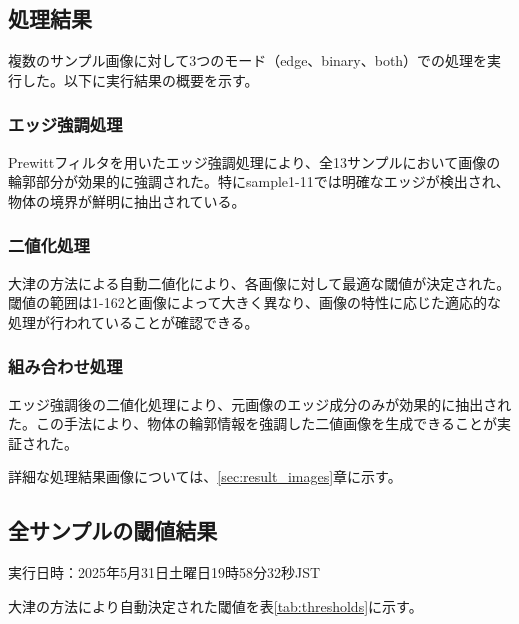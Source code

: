 \documentclass[a4paper,12pt]{jsarticle}
\begin{document}
\subsection{処理結果}

複数のサンプル画像に対して3つのモード（edge、binary、both）での処理を実行した。以下に実行結果の概要を示す。

\subsubsection{エッジ強調処理}
Prewittフィルタを用いたエッジ強調処理により、全13サンプルにおいて画像の輪郭部分が効果的に強調された。特にsample1-11では明確なエッジが検出され、物体の境界が鮮明に抽出されている。

\subsubsection{二値化処理}
大津の方法による自動二値化により、各画像に対して最適な閾値が決定された。閾値の範囲は1-162と画像によって大きく異なり、画像の特性に応じた適応的な処理が行われていることが確認できる。

\subsubsection{組み合わせ処理}
エッジ強調後の二値化処理により、元画像のエッジ成分のみが効果的に抽出された。この手法により、物体の輪郭情報を強調した二値画像を生成できることが実証された。

詳細な処理結果画像については、\ref{sec:result_images}章に示す。

\subsection{全サンプルの閾値結果}

実行日時：2025年5月31日土曜日19時58分32秒JST

大津の方法により自動決定された閾値を表\ref{tab:thresholds}に示す。
\end{document}
